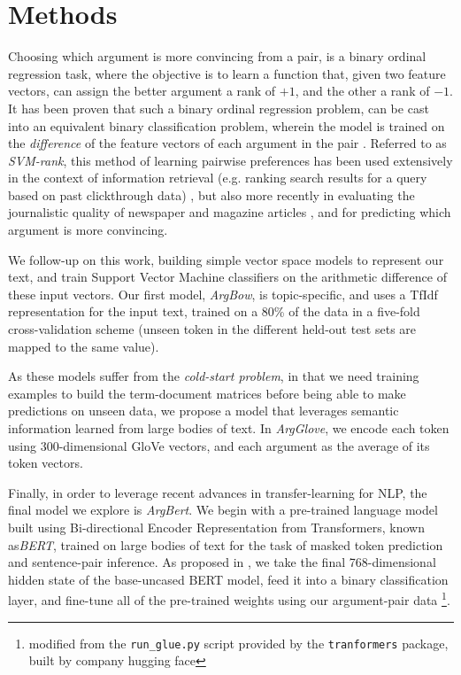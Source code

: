 \documentclass[runningheads]{llncs}
\begin{document}
\section{Methods}
Choosing which argument is more convincing from a pair, is a binary 
ordinal regression task, where the objective is to learn a function that, given 
two feature vectors, can assign the better argument a rank of $+1$, and the 
other a rank of $-1$.   
It has been proven that such a binary ordinal regression problem, can be cast 
into an equivalent binary classification problem, wherein the model is trained 
on the \textit{difference} of the feature vectors of each argument in the pair 
\cite{herbrich_support_1999}. 
Referred to as \textit{SVM-rank}, this method of learning pairwise preferences 
has been used extensively in the context of information retrieval (e.g. ranking 
search results for a query based on past clickthrough data) 
\cite{joachims_optimizing_2002}, but also more recently in evaluating the 
journalistic quality of newspaper and magazine articles \cite{louis_what_2013}, 
and for predicting which argument is more convincing\cite{habernal_which_2016}.

We follow-up on this work, building simple vector space models to represent our 
text, and train Support Vector Machine classifiers on the arithmetic difference 
of these input vectors. Our first model, \textit{ArgBow}, is topic-specific, 
and uses a TfIdf representation for the input text, trained on a 80\% of the 
data in a five-fold cross-validation scheme (unseen token in the different 
held-out test sets are mapped to the same value). 

As these models suffer from the \textit{cold-start problem}, in that we need 
training examples to build the term-document matrices before being able to make 
predictions on unseen data, we propose a model that leverages semantic 
information learned from large bodies of text. In \textit{ArgGlove}, we encode 
each token using 300-dimensional GloVe vectors\cite{pennington_glove:_2014}, 
and each argument as the average of its token vectors. 

Finally, in order to leverage recent advances in transfer-learning for NLP, the 
final model we explore is \textit{ArgBert}.
We begin with a pre-trained language model built using  Bi-directional Encoder 
Representation from Transformers, known as\textit{BERT}\cite{devlin_bert_2018}, 
trained on large bodies of text for the task of masked token prediction and 
sentence-pair inference. 
As proposed in \cite{toledo_automatic_2019}, we take the final 768-dimensional 
hidden state of the base-uncased BERT model, feed it into a binary 
classification layer, and fine-tune all of the pre-trained weights 
using our argument-pair data 
\footnote{modified from the \verb|run_glue.py| 
script provided by the \verb|tranformers| package, built by company hugging 
face}.
\end{document}
